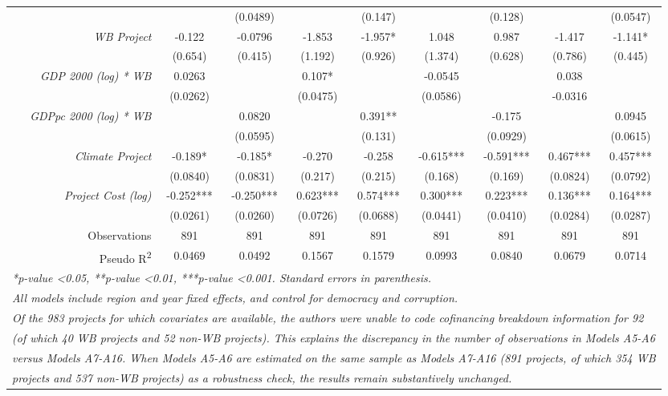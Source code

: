 \documentclass{article}
\begin{document}
\begin{singlespace}
\begin{table}[H]
{\begin{tabular}{rcccccccc}
			\textit{} &  & (0.0489) &  & (0.147) &  & (0.128) &  & (0.0547) \\
			\textit{WB Project} & -0.122 & -0.0796 & -1.853 & -1.957* & 1.048 & 0.987 & -1.417 & -1.141* \\
			\textit{} & (0.654) & (0.415) & (1.192) & (0.926) & (1.374) & (0.628) & (0.786) & (0.445) \\
			\textit{GDP 2000 (log) * WB} & 0.0263 &  & 0.107* &  & -0.0545 &  & 0.038 &  \\
			\textit{} & (0.0262) &  & (0.0475) &  & (0.0586) &  & -0.0316 &  \\
			\textit{GDPpc 2000 (log) * WB} &  & 0.0820 &  & 0.391** &  & -0.175 &  & 0.0945 \\
			\textit{} &  & (0.0595) &  & (0.131) &  & (0.0929) &  & (0.0615) \\
			\textit{Climate Project} & -0.189* & -0.185* & -0.270 & -0.258 & -0.615*** & -0.591*** & 0.467*** & 0.457*** \\
			\textit{} & (0.0840) & (0.0831) & (0.217) & (0.215) & (0.168) & (0.169) & (0.0824) & (0.0792) \\
			\textit{Project Cost (log)} & -0.252*** & -0.250*** & 0.623*** & 0.574*** & 0.300*** & 0.223*** & 0.136*** & 0.164*** \\
			\textit{} & (0.0261) & (0.0260) & (0.0726) & (0.0688) & (0.0441) & (0.0410) & (0.0284) & (0.0287) \\ \hline
			Observations & 891 & 891 & 891 & 891 & 891 & 891 & 891 & 891 \\
			Pseudo R\textsuperscript{2} & 0.0469 & 0.0492 & 0.1567 & 0.1579 & 0.0993 & 0.0840 & 0.0679 & 0.0714 \\ \hline
			\multicolumn{9}{l}{\textit{*p-value \textless 0.05, **p-value \textless 0.01, ***p-value \textless 0.001.  Standard errors in parenthesis.}} \\
			\multicolumn{9}{l}{\textit{All models include region and year fixed effects, and control for democracy and corruption.}} \\
			\multicolumn{9}{l}{\textit{Of the 983 projects for which covariates are available, the authors were unable to code cofinancing breakdown information for 92}} \\
			\multicolumn{9}{l}{\textit{(of which 40 WB projects and 52 non-WB projects). This explains the discrepancy in the number of observations in Models A5-A6}} \\
			\multicolumn{9}{l}{\textit{versus Models A7-A16. When Models A5-A6 are estimated on the same sample as Models A7-A16 (891 projects, of which 354 WB}} \\
			\multicolumn{9}{l}{\textit{projects and 537 non-WB projects) as a robustness check, the results remain substantively unchanged.}}
		\end{tabular}%
	}
\end{table}



\end{singlespace}	
\end{document}
